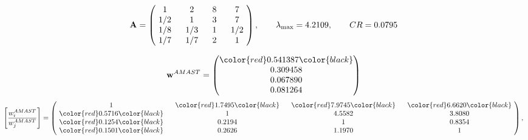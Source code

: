 \begin{example}
\begin{equation*}
\mathbf{A} =
\begin{pmatrix}
$\,\,$ 1 $\,\,$ & $\,\,$2$\,\,$ & $\,\,$8$\,\,$ & $\,\,$7 $\,\,$ \\
$\,\,$ 1/2$\,\,$ & $\,\,$ 1 $\,\,$ & $\,\,$3$\,\,$ & $\,\,$7 $\,\,$ \\
$\,\,$ 1/8$\,\,$ & $\,\,$ 1/3$\,\,$ & $\,\,$ 1 $\,\,$ & $\,\,$ 1/2 $\,\,$ \\
$\,\,$ 1/7$\,\,$ & $\,\,$ 1/7$\,\,$ & $\,\,$2$\,\,$ & $\,\,$ 1  $\,\,$ \\
\end{pmatrix},
\qquad
\lambda_{\max} =
4.2109,
\qquad
CR = 0.0795
\end{equation*}

\begin{equation*}
\mathbf{w}^{AMAST} =
\begin{pmatrix}
\color{red} 0.541387\color{black} \\
0.309458\\
0.067890\\
0.081264
\end{pmatrix}\end{equation*}
\begin{equation*}
\left[ \frac{{w}^{AMAST}_i}{{w}^{AMAST}_j} \right] =
\begin{pmatrix}
$\,\,$ 1 $\,\,$ & $\,\,$\color{red} 1.7495\color{black} $\,\,$ & $\,\,$\color{red} 7.9745\color{black} $\,\,$ & $\,\,$\color{red} 6.6620\color{black} $\,\,$ \\
$\,\,$\color{red} 0.5716\color{black} $\,\,$ & $\,\,$ 1 $\,\,$ & $\,\,$4.5582$\,\,$ & $\,\,$3.8080  $\,\,$ \\
$\,\,$\color{red} 0.1254\color{black} $\,\,$ & $\,\,$0.2194$\,\,$ & $\,\,$ 1 $\,\,$ & $\,\,$0.8354 $\,\,$ \\
$\,\,$\color{red} 0.1501\color{black} $\,\,$ & $\,\,$0.2626$\,\,$ & $\,\,$1.1970$\,\,$ & $\,\,$ 1  $\,\,$ \\
\end{pmatrix},
\end{equation*}


\end{example}
